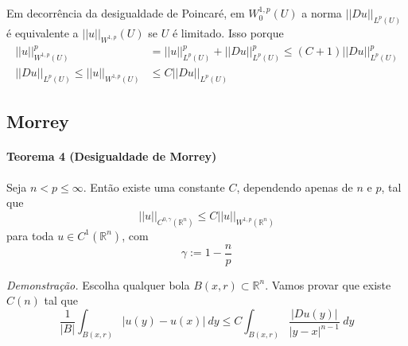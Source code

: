 \documentclass[a4paper, 11pt]{article}
\newcommand{\Rn}{{\mathbb{R}^n}}
\newcommand{\nor}[2]{||#1||_{#2}}
\begin{document}
Em decorrência da desigualdade de Poincaré, em $ W^{1,p}_0(U) $ a norma $ ||Du||_{L^p(U)} $ é equivalente a $ ||u||_{W^{1,p}}(U) $ se $U$ é limitado. Isso porque \begin{align*}
	 ||u||_{W^{1,p}(U)}^p &= \nor{u}{L^p(U)}^p + \nor{Du}{L^p(U)}^p \leq (C + 1) \nor{Du}{L^p(U)}^p \\
	 \nor{Du}{L^p(U)} \leq ||u||_{W^{1,p}(U)} &\leq C \nor{Du}{L^p(U)}
\end{align*}


\subsection{Morrey}

\paragraph{Teorema 4 (Desigualdade de Morrey)}\label{t:sobolev-ineq-t4} Seja \( n < p \leq \infty \). Então existe uma constante \( C\), dependendo apenas de \(n\) e \(p\), tal que \[ ||u||_{C^{0, \gamma}(\Rn)} \leq C ||u||_{W^{1,p}(\Rn)} \] para toda \( u \in C^1 (\Rn)\), com \[ \gamma := 1 - \frac{n}{p} \]

\textit{Demonstração.} Escolha qualquer bola $B(x,r) \subset \Rn$. Vamos provar que existe $ C(n) $ tal que \[ \frac{1}{|B|} \int_{B(x,r)} |u(y) - u(x)| \ dy \leq C \int_{B(x,r)}  \frac{|Du(y)|}{|y-x|^{n-1}}\ dy   \]
\end{document}
